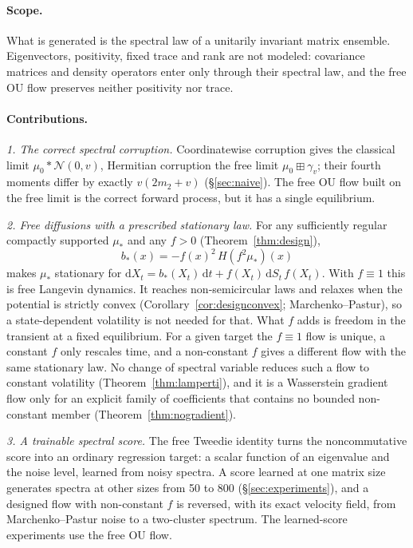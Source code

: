 \documentclass[11pt]{article}
\newcommand{\dd}{\mathrm{d}}
\theoremstyle{plain}
\theoremstyle{definition}
\theoremstyle{remark}
\begin{document}
\paragraph{Scope.} What is generated is the spectral law of a unitarily invariant matrix ensemble.
Eigenvectors, positivity, fixed trace and rank are not modeled: covariance matrices and density
operators enter only through their spectral law, and the free OU flow preserves neither positivity
nor trace.

\paragraph{Contributions.}
\emph{1. The correct spectral corruption.} Coordinatewise corruption gives the classical limit
$\mu_0*\mathcal N(0,v)$, Hermitian corruption the free limit $\mu_0\boxplus\gamma_v$; their fourth
moments differ by exactly $v(2m_2+v)$ (\S\ref{sec:naive}). The free OU flow built on the free
limit is the correct forward process, but it has a single equilibrium.

\emph{2. Free diffusions with a prescribed stationary law.} For any sufficiently regular
compactly supported $\mu_*$ and any $f>0$ (Theorem~\ref{thm:design}),
\[
  \boxed{\;b_*(x)=-f(x)^2\,H(f^2\mu_*)(x)\;}
\]
makes $\mu_*$ stationary for $\dd X_t=b_*(X_t)\,\dd t+f(X_t)\,\dd S_t\,f(X_t)$. With $f\equiv1$
this is free Langevin dynamics. It reaches non-semicircular laws and relaxes when the potential
is strictly convex (Corollary~\ref{cor:designconvex}; Marchenko--Pastur), so a state-dependent
volatility is not needed for that. What $f$ adds is freedom in the transient at a fixed equilibrium.
For a given target the $f\equiv1$ flow is unique, a constant $f$ only rescales time, and a
non-constant $f$ gives a different flow with the same stationary law. No change of spectral
variable reduces such a flow to constant volatility (Theorem~\ref{thm:lamperti}), and it is a
Wasserstein gradient flow only for an explicit family of coefficients that contains no bounded
non-constant member (Theorem~\ref{thm:nogradient}).

\emph{3. A trainable spectral score.} The free Tweedie identity turns the noncommutative score into an
ordinary regression target: a scalar function of an eigenvalue and the noise level, learned from noisy spectra. A score learned at
one matrix size generates spectra at other sizes from 50 to 800 (\S\ref{sec:experiments}), and a designed flow with non-constant $f$ is
reversed, with its exact velocity field, from Marchenko--Pastur noise to a two-cluster spectrum. The learned-score experiments use
the free OU flow.
\end{document}
